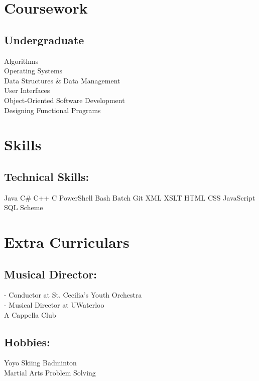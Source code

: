 \documentclass[letterpaper]{kevin-resume} %
\begin{document}
\begin{minipage}[t]{0.30\textwidth}
\section{Coursework}

\subsection{Undergraduate}

Algorithms \\
Operating Systems \\
Data Structures \& Data Management \\
User Interfaces \\
Object-Oriented Software Development \\
Designing Functional Programs \\

\sectionspace %


\section{Skills}

\subsection{Technical Skills:}
Java \textbullet{}
C\# \textbullet{} 
C++ \textbullet{} 
C \textbullet{}
PowerShell
Bash \textbullet{} 
Batch \textbullet{} 
Git \textbullet{} 
XML \textbullet{} 
XSLT
HTML \textbullet{} 
CSS \textbullet{} 
JavaScript \textbullet{} 
SQL
Scheme

\sectionspace %

\section{Extra Curriculars}
\subsection{Musical Director:}
 - Conductor at St. Cecilia’s Youth Orchestra \\
 - Musical Director at UWaterloo \\A Cappella Club
\sectionspace %
\subsection{Hobbies:}
Yoyo \textbullet{} 
Skiing \textbullet{} 
Badminton \\
Martial Arts \textbullet{} 
Problem Solving


\end{minipage} %
\end{document}
